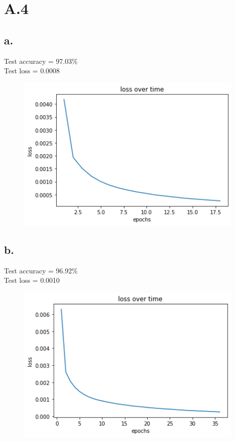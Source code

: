 \documentclass{article}
\newcommand{\1}{\mathbf{1}}
\begin{document}
\section*{A.4}
{\Large 

\subsection*{a.}

Test accuracy = 97.03\% \\
Test loss = 0.0008

\begin{figure}[h]
  \centering
  \includegraphics[width=110mm]{../hw3-code/results/a4_a.png}
\end{figure}

\subsection*{b.}

Test accuracy = 96.92\% \\
Test loss = 0.0010

\begin{figure}[h]
  \centering
  \includegraphics[width=110mm]{../hw3-code/results/a4_b.png}
\end{figure}

}
\end{document}
